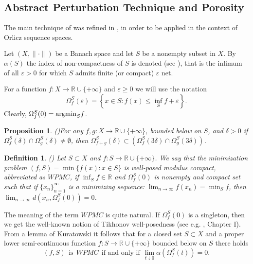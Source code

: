 \documentclass[12pt]{article}
\theoremstyle{thmstyleone}%
\newtheorem{proposition}[theorem]{Proposition}%
\theoremstyle{thmstyletwo}%
\theoremstyle{thmstylethree}%
\newtheorem{definition}{Definition}%
\begin{document}
\subsection{Abstract Perturbation Technique and Porosity}

The main technique of \cite{Ivanov-Zlateva} was refined in \cite{Topalova-Zlateva}, in order to be applied in the context of Orlicz sequence spaces.

Let $(X,\|\cdot\|)$ be a Banach space and let $S$ be a nonempty subset in $X$. By $\alpha(S)$ the 
 index of non-compactness of $S$ is denoted (see \cite{Kuratowski}), that is the infimum of all $\varepsilon >0$ for which $S$ admits finite (or compact) $\varepsilon$ net.

For a function $f:X\to \mathbb{R}\cup \{+\infty\}$ and $\varepsilon\geq 0$ we will use the notation
$$
\Omega_f^S(\varepsilon)=\left\{x\in S:f(x)\leq\inf_{S}f+\varepsilon\right\}.
$$
Clearly, $\Omega_f^S(0) = {\rm argmin}_Sf$.

\begin{proposition}(\cite{Topalova-Zlateva})\label{proposition:1}
	For any $f,g:X\to \mathbb{R}\cup \{+\infty\}$, bounded below on $S$, and $\delta>0$ if
	$\Omega_f^S(\delta)\cap \Omega_g^S(\delta)\not=\emptyset$, then
	$\Omega_{f+g}^S(\delta)\subset \left(\Omega_f^S(3\delta)\cap \Omega_g^S(3\delta)\right)$. 	
\end{proposition}

\begin{definition}\label{definition:1}(\cite{Ivanov-Zlateva-13})
	Let $S\subset X$ and $f:S\to \mathbb{R}\cup \{+\infty\}$. We say that the minimization problem
	$(f,S)=\min\{f(x):x\in S\}$ is well-posed modulus compact, abbreviated as $WPMC$, if $\inf_S f\in \mathbb{R}$ and
	$\Omega_f^S(0)$ is nonempty and compact set such that if $\{x_n\}_{n=1}^\infty$ is a minimizing
	sequence: $\lim_{n\to\infty}f(x_n)=\min_S f$, then
	$\lim_{n\to\infty}d\left(x_n,\Omega_f^S(0)\right)=0$.
\end{definition}

The meaning of the term $WPMC$ is quite natural. If $\Omega_f^S(0)$ is a singleton,
then we get the well-known notion of Tikhonov well-posedness (see e.g. \cite{Dontchev-Zolezzi}, Chapter I). From a lemma of Kuratowski it follows \cite{Ivanov-Zlateva-13} that for a closed set $S\subset X$ and a proper lower semi-continuous function $f:S\to\mathbb{R}\cup\{+\infty\}$ bounded below on $S$ there holds
\begin{equation}\label{Kuratowski}
(f,S)\ \  \mbox{is}\ \  WPMC\ \ \mbox{if and only if}\ \ \lim_{t\downarrow 0}\alpha\left(\Omega_f^S(t)\right)=0.
\end{equation}
\end{document}

